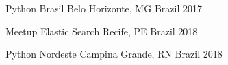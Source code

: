 


\begin{cvhonors}


\cvhonor
{Python Brasil} %
{Belo Horizonte, MG} %
{Brazil} %
{2017} %
    

\cvhonor
{Meetup Elastic Search} %
{Recife, PE} %
{Brazil} %
{2018} %
    

\cvhonor
{Python Nordeste} %
{Campina Grande, RN} %
{Brazil} %
{2018} %


\end{cvhonors}